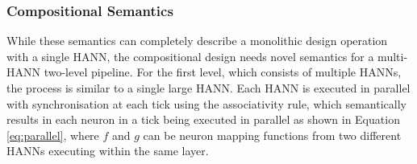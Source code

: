 




\subsubsection{Compositional Semantics}
While these semantics can completely describe a monolithic design operation with a single HANN, the compositional design needs novel semantics for a multi-HANN two-level pipeline. For the first level, which consists of multiple HANNs, the process is similar to a single large HANN. Each HANN is executed in parallel with synchronisation at each tick using the associativity rule, which semantically results in each neuron in a tick being executed in parallel as shown in Equation \ref{eq:parallel}, where $f$ and $g$ can be neuron mapping functions from two different HANNs executing within the same layer.




